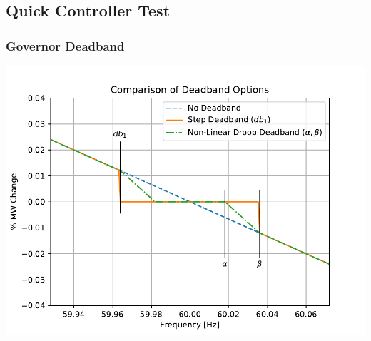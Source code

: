 \documentclass[14pt, unknownkeysallowed]{beamer}
\begin{document}
\subsection{Quick Controller Test}
\begin{frame}
\frametitle{Governor Deadband}
\begin{center}
\includegraphics[height=.85\textheight]{dbAction2}
\end{center}

\end{frame}
\end{document}
